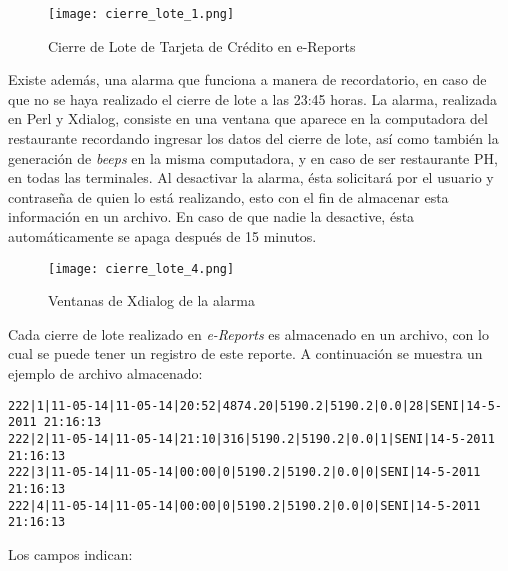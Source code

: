\begin{figure}[htb]
 \begin{center}
  \texttt{[image: cierre\_lote\_1.png]}
 \end{center}
 \caption{Cierre de Lote de Tarjeta de Crédito en e-Reports}
 \label{fig:cierre_lote_1}
\end{figure}

Existe además, una alarma que funciona a manera de recordatorio, en caso de que no se haya realizado el cierre de lote a las 23:45 horas. La alarma, realizada en Perl y Xdialog, consiste en una ventana que aparece en la computadora del restaurante recordando ingresar los datos del cierre de lote, así como también la generación de \textit{beeps} en la misma computadora, y en caso de ser restaurante PH, en todas las terminales. Al desactivar la alarma, ésta solicitará por el usuario y contraseña de quien lo está realizando, esto con el fin de almacenar esta información en un archivo. En caso de que nadie la desactive, ésta automáticamente se apaga después de 15 minutos.

\begin{figure}[htb]
 \begin{center}
  \texttt{[image: cierre\_lote\_4.png]}
 \end{center}
 \caption{Ventanas de Xdialog de la alarma}
 \label{fig:cierre_lote_4}
\end{figure}

Cada cierre de lote realizado en \textit{e-Reports} es almacenado en un archivo, con lo cual se puede tener un registro de este reporte. A continuación se muestra un ejemplo de archivo almacenado:

\begin{Verbatim}[fontsize=\small]
222|1|11-05-14|11-05-14|20:52|4874.20|5190.2|5190.2|0.0|28|SENI|14-5-2011 21:16:13
222|2|11-05-14|11-05-14|21:10|316|5190.2|5190.2|0.0|1|SENI|14-5-2011 21:16:13
222|3|11-05-14|11-05-14|00:00|0|5190.2|5190.2|0.0|0|SENI|14-5-2011 21:16:13
222|4|11-05-14|11-05-14|00:00|0|5190.2|5190.2|0.0|0|SENI|14-5-2011 21:16:13
\end{Verbatim}

Los campos indican:

